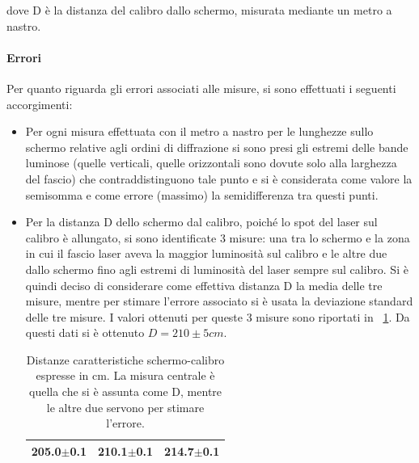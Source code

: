 \documentclass[a4paper,10pt]{article}
\begin{document}
{{dove D è la distanza del calibro dallo schermo, misurata mediante un metro a nastro.
\paragraph{Errori}
Per quanto riguarda gli errori associati alle misure, si sono effettuati i seguenti accorgimenti:
\begin{itemize}
\item Per ogni misura effettuata con il metro a nastro per le lunghezze sullo schermo relative agli ordini di diffrazione si sono presi gli estremi delle bande luminose (quelle verticali,
quelle orizzontali sono dovute solo alla larghezza del fascio) che contraddistinguono tale punto e si è considerata come valore la semisomma e come errore (massimo) la semidifferenza tra questi punti.
\item Per la distanza D dello schermo dal calibro, poiché lo spot del laser sul calibro è allungato, si sono identificate 3 misure: una tra lo schermo e la zona in cui il fascio laser aveva la maggior luminosità sul calibro e le altre due dallo schermo fino agli estremi di luminosità del laser sempre sul calibro. Si è quindi deciso di considerare come effettiva distanza D la media delle tre misure, mentre per stimare l'errore associato si è usata la deviazione standard delle tre misure. I valori ottenuti per queste 3 misure sono riportati in \tablename{~\ref{tab:D}}. Da questi dati si è ottenuto $D = 210 \pm 5 cm$.

\begin{table}[H]
	\centering
	\begin{tabular}{c|c|c}
\hline
205.0$\pm$0.1 & 210.1$\pm$0.1 & 214.7$\pm$0.1\\
\hline
	\end{tabular}
\caption{Distanze caratteristiche schermo-calibro espresse in cm. La misura centrale è quella che si è assunta come D, mentre le altre due servono per stimare l'errore.}
\label{tab:D}
\end{table}


\end{itemize}}}
\end{document}
